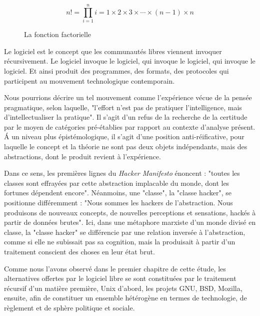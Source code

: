 \setcounter{equation}{1}
\begin{figure}[h]
\caption{La fonction factorielle} 
\begin{equation}
n!=\prod_{i=1}^n i= 1 \times 2 \times 3 \times \cdots \times (n - 1) \times n
\end{equation} \label{fig3.2}
\end{figure}

Le logiciel est le concept que les communautés libres viennent invoquer récursivement. Le logiciel invoque le logiciel, qui invoque le logiciel, qui invoque le logiciel. Et ainsi produit des programmes, des formats, des protocoles qui participent au mouvement technologique contemporain.

Nous pourrions décrire un tel mouvement comme l'expérience vécue de la pensée pragmatique, selon laquelle, "l'effort n'est pas de pratiquer l'intelligence, mais d'intellectualiser la pratique"\citep{Dewey1929}. Il s'agit d'un refus de la recherche de la certitude par le moyen de catégories pré-établies par rapport au contexte d'analyse présent. \'A un niveau plus épistémologique, il s'agit d'une position anti-réificative, pour laquelle le concept et la théorie ne sont pas deux objets indépendants, mais des abstractions, dont le produit revient à l'expérience.

Dans ce sens, les premières lignes du \emph{Hacker Manifesto} énoncent : "toutes les classes sont effrayées par cette abstraction implacable du monde, dont les fortunes dépendent encore". Néanmoins, une "classe", la "classe hacker", se positionne différemment : "Nous sommes les hackers de l'abstraction. Nous produisons de nouveaux concepts, de nouvelles perceptions et sensations, hackés à partir de données brutes". Ici, dans une métaphore marxiste d'un monde divisé en classe, la "classe hacker" se différencie par une relation inversée à l'abstraction, comme si elle ne subissait pas sa cognition, mais la produisait à partir d'un traitement conscient des choses en leur état brut.

Comme nous l'avons observé dans le premier chapitre de cette étude, les alternatives offertes par le logiciel libre se sont constituées par le traitement récursif d'un matière première, Unix d'abord, les projets GNU, BSD, Mozilla, ensuite, afin de constituer un ensemble hétérogène en termes de technologie, de règlement et de sphère politique et sociale.

